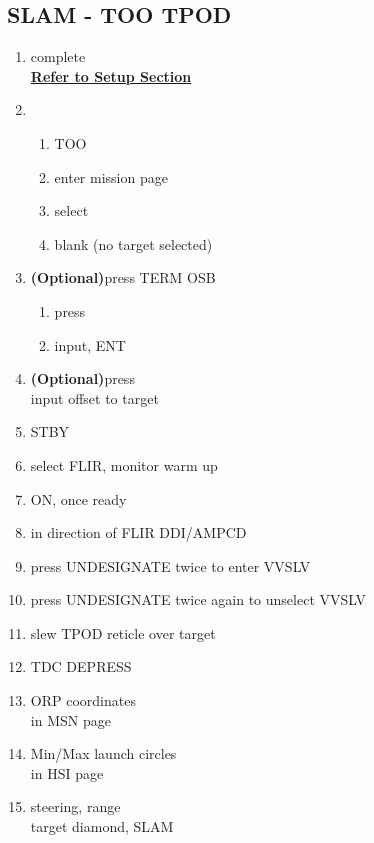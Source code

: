 \documentclass[fontInter, widesubsec]{TechCheck}
\begin{document}
	\subsection{SLAM - TOO TPOD}
	\begin{enumerate}
		\item {}\dotfill complete \\
		\hfill \hyperref[subsec:84setup]{\textbf{Refer to Setup Section}}
		\item {}
		\begin{enumerate}
			\item {}\dotfill TOO
			\item {}\dotfill enter mission page
			\item {}\dotfill select
			\item {}\dotfill blank (no target selected)
		\end{enumerate}
		\item {} \textbf{(Optional)}\dotfill press TERM OSB
		\begin{enumerate}
			\item {}\dotfill press
			\item {}\dotfill input, ENT
		\end{enumerate}
		\item {} \textbf{(Optional)}\dotfill press \\
		\hfill input offset to target
		\item {}\dotfill STBY
		\item {}\dotfill select FLIR, monitor warm up
		\item {}\dotfill ON, once ready
		\item {}\dotfill in direction of FLIR DDI/AMPCD
		\item {}\dotfill press UNDESIGNATE twice to enter VVSLV
		\item {}\dotfill press UNDESIGNATE twice again to unselect VVSLV
		\item {}\dotfill slew TPOD reticle over target
		\item {}\dotfill TDC DEPRESS
		\item {}\dotfill ORP coordinates\\
		\hfill  in MSN page
		\item {}\dotfill Min/Max launch circles\\
		\hfill in HSI page
		\item {}\dotfill steering, range \\
		\hfill  target diamond, SLAM
	\end{enumerate}
\end{document}
